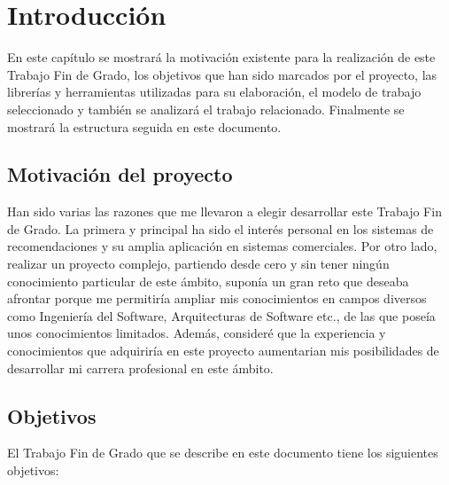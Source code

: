 \chapter{Introducción}
\thispagestyle{empty}

En este capítulo se mostrará la motivación existente para la realización de este Trabajo Fin de Grado, los objetivos que han sido marcados por el proyecto, las librerías y herramientas utilizadas para su elaboración, el modelo de trabajo seleccionado y también se analizará el trabajo relacionado. Finalmente se mostrará la estructura seguida en este documento.

\section{Motivación del proyecto}
\thispagestyle{empty}


Han sido varias las razones que me llevaron a elegir desarrollar este Trabajo Fin de Grado. La primera y principal ha sido el interés personal en los sistemas de recomendaciones y su amplia aplicación en sistemas comerciales. Por otro lado, realizar un proyecto complejo, partiendo desde cero y sin tener ningún conocimiento particular de este ámbito, suponía un gran reto que deseaba afrontar porque me permitiría ampliar mis conocimientos en campos diversos como Ingeniería del Software, Arquitecturas de Software etc., de las que poseía unos conocimientos limitados. Además, consideré que la experiencia y conocimientos que adquiriría en este proyecto aumentarian mis posibilidades de desarrollar mi carrera profesional en este ámbito.

\section{Objetivos}
\thispagestyle{empty}


El Trabajo Fin de Grado que se describe en este documento tiene los siguientes objetivos:

